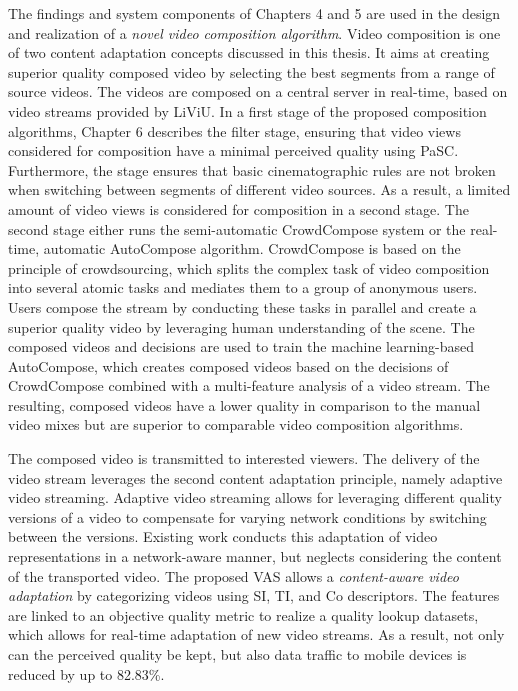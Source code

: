 The findings and system components of Chapters 4 and 5 are used in the design and realization of a \emph{novel video composition algorithm}.
Video composition is one of two content adaptation concepts discussed in this thesis.
It aims at creating superior quality composed video by selecting the best segments from a range of source videos. 
The videos are composed on a central server in real-time, based on video streams provided by \ac{LiViU}. 
In a first stage of the proposed composition algorithms, Chapter 6 describes the filter stage, ensuring that video views considered for composition have a minimal perceived quality using \ac{PaSC}.
Furthermore, the stage ensures that basic cinematographic rules are not broken when switching between segments of different video sources.
As a result, a limited amount of video views is considered for composition in a second stage.
The second stage either runs the semi-automatic CrowdCompose system or the real-time, automatic AutoCompose algorithm.
CrowdCompose is based on the principle of crowdsourcing, which splits the complex task of video composition into several atomic tasks and mediates them to a group of anonymous users.
Users compose the stream by conducting these tasks in parallel and create a superior quality video by leveraging human understanding of the scene.
The composed videos and decisions are used to train the machine learning-based AutoCompose, which creates composed videos based on the decisions of CrowdCompose combined with a multi-feature analysis of a video stream.
The resulting, composed videos have a lower quality in comparison to the manual video mixes but are superior to comparable video composition algorithms.

The composed video is transmitted to interested viewers.
The delivery of the video stream leverages the second content adaptation principle, namely adaptive video streaming.
Adaptive video streaming allows for leveraging different quality versions of a video to compensate for varying network conditions by switching between the versions.
Existing work conducts this adaptation of video representations in a network-aware manner, but neglects considering the content of the transported video.
The proposed \ac{VAS} allows a \emph{content-aware video adaptation} by categorizing videos using \acf{SI}, \acf{TI}, and \acf{Co} descriptors. 
The features are linked to an objective quality metric to realize a quality lookup datasets, which allows for real-time adaptation of new video streams.
As a result, not only can the perceived quality be kept, but also data traffic to mobile devices is reduced by up to 82.83\%.

